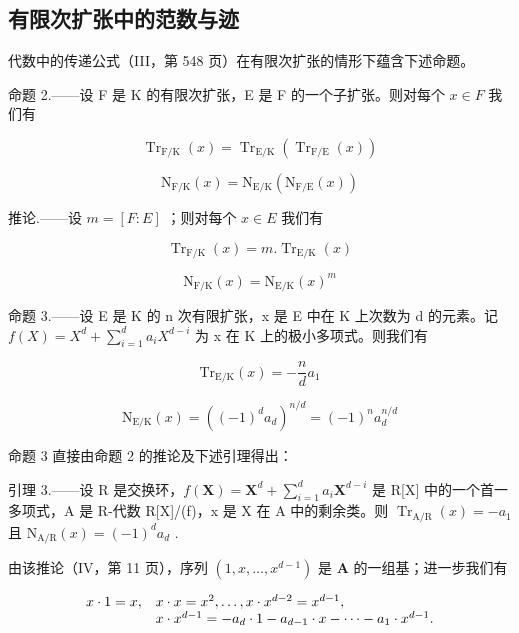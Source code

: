 \subsection{有限次扩张中的范数与迹}

代数中的传递公式（III，第 548 页）在有限次扩张的情形下蕴含下述命题。

命题 2.——设 F 是 K 的有限次扩张，E 是 F 的一个子扩张。则对每个 \(x \in F\) 我们有

\[
\operatorname{Tr} _ {\mathrm{F} / \mathrm{K}} (x) = \operatorname{Tr} _ {\mathrm{E} / \mathrm{K}} (\operatorname{Tr} _ {\mathrm{F} / \mathrm{E}} (x))\tag{6}
\]

\[
\mathrm{N} _ {\mathrm{F} / \mathrm{K}} (x) = \mathrm{N} _ {\mathrm{E} / \mathrm{K}} (\mathrm{N} _ {\mathrm{F} / \mathrm{E}} (x))\tag{7}
\]

推论.——设 \(m = [F : E]\) ；则对每个 \(x \in E\) 我们有

\[
\operatorname{Tr} _ {\mathrm{F} / \mathrm{K}} (x) = m. \operatorname{Tr} _ {\mathrm{E} / \mathrm{K}} (x)\tag{8}
\]

\[
\mathrm{N} _ {\mathrm{F} / \mathrm{K}} (x) = \mathrm{N} _ {\mathrm{E} / \mathrm{K}} (x) ^ {m}\tag{9}
\]

命题 3.——设 E 是 K 的 n 次有限扩张，x 是 E 中在 K 上次数为 d 的元素。记 \(f(X) = X^d + \sum_{i=1}^{d} a_i X^{d-i}\) 为 x 在 K 上的极小多项式。则我们有

\[
\mathrm{Tr} _ {\mathrm{E/K}} (x) = - \frac {n}{d} a _ {1}\tag{10}
\]

\[
\mathrm{N} _ {\mathrm{E} / \mathrm{K}} (x) = ((- 1) ^ {d} a _ {d}) ^ {n / d} = (- 1) ^ {n} a _ {d} ^ {n / d}\tag{11}
\]

命题 3 直接由命题 2 的推论及下述引理得出：

引理 3.——设 R 是交换环，\(f(\mathbf{X}) = \mathbf{X}^d + \sum_{i=1}^{d} a_i \mathbf{X}^{d-i}\) 是 R{[}X{]} 中的一个首一多项式，A 是 R-代数 R{[}X{]}/(f)，x 是 X 在 A 中的剩余类。则 \(\operatorname{Tr}_{\mathrm{A/R}}(x) = -a_1\) 且 \(\mathrm{N}_{\mathrm{A/R}}(x) = (-1)^d a_d\) .

由该推论（IV，第 11 页），序列 \((1, x, \ldots, x^{d-1})\) 是 \(\mathbf{A}\) 的一组基；进一步我们有

\[
\begin{array}{r l} x \cdot 1 = x, & x \cdot x = x ^ {2}, \dots , x \cdot x ^ {d - 2} = x ^ {d - 1}, \\ & x \cdot x ^ {d - 1} = - a _ {d} \cdot 1 - a _ {d - 1} \cdot x - \dots - a _ {1} \cdot x ^ {d - 1}. \end{array}
\]

